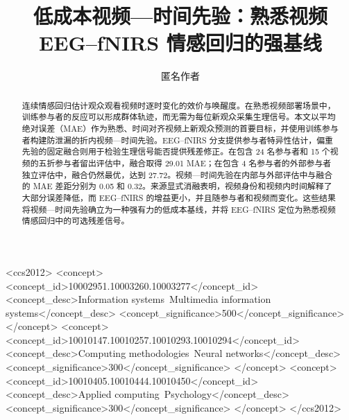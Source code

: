 \documentclass[sigconf,screen,review,anonymous]{acmart}
\begin{document}
\title{低成本视频—时间先验：熟悉视频 EEG--fNIRS 情感回归的强基线}

\author{匿名作者}
\email{}

\begin{abstract}
连续情感回归估计观众观看视频时逐时变化的效价与唤醒度。在熟悉视频部署场景中，训练参与者的反应可以形成群体轨迹，而无需为每位新观众采集生理信号。本文以平均绝对误差（MAE）作为熟悉、时间对齐视频上新观众预测的首要目标，并使用训练参与者构建防泄漏的折内视频—时间先验。EEG--fNIRS 分支提供参与者特异性估计，偏重先验的固定融合则用于检验生理信号能否提供残差修正。在包含 24 名参与者和 15 个视频的五折参与者留出评估中，融合取得 29.01 MAE；在包含 4 名参与者的外部参与者独立评估中，融合仍然最优，达到 27.72。视频—时间先验在内部与外部评估中与融合的 MAE 差距分别为 0.05 和 0.32。来源显式消融表明，视频身份和视频内时间解释了大部分误差降低，而 EEG--fNIRS 的增益更小，并且随参与者和视频而变化。这些结果将视频—时间先验确立为一种强有力的低成本基线，并将 EEG--fNIRS 定位为熟悉视频情感回归中的可选残差信号。
\end{abstract}

\begin{CCSXML}
<ccs2012>
  <concept>
    <concept_id>10002951.10003260.10003277</concept_id>
    <concept_desc>Information systems~Multimedia information systems</concept_desc>
    <concept_significance>500</concept_significance>
  </concept>
  <concept>
    <concept_id>10010147.10010257.10010293.10010294</concept_id>
    <concept_desc>Computing methodologies~Neural networks</concept_desc>
    <concept_significance>300</concept_significance>
  </concept>
  <concept>
    <concept_id>10010405.10010444.10010450</concept_id>
    <concept_desc>Applied computing~Psychology</concept_desc>
    <concept_significance>300</concept_significance>
  </concept>
</ccs2012>
\end{CCSXML}



\maketitle



\clearpage
\balance


\end{document}
